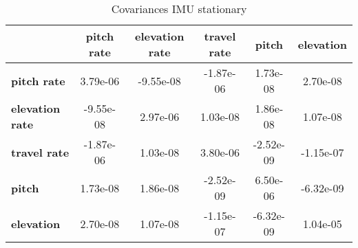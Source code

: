 \begin{table}[h!]
\centering
\begin{tiny}\begin{tabular}{|l|c|c|c|c|c|}
\hline
&\textbf{pitch rate}&\textbf{elevation rate}&\textbf{travel rate}&\textbf{pitch}&\textbf{elevation}\\\hline
\textbf{pitch rate}&3.79e-06&-9.55e-08&-1.87e-06&1.73e-08&2.70e-08\\\hline
\textbf{elevation rate}&-9.55e-08&2.97e-06&1.03e-08&1.86e-08&1.07e-08\\\hline
\textbf{travel rate}&-1.87e-06&1.03e-08&3.80e-06&-2.52e-09&-1.15e-07\\\hline
\textbf{pitch}&1.73e-08&1.86e-08&-2.52e-09&6.50e-06&-6.32e-09\\\hline
\textbf{elevation}&2.70e-08&1.07e-08&-1.15e-07&-6.32e-09&1.04e-05\\\hline
\end{tabular}
\end{tiny}
\caption{Covariances IMU stationary}
\label{table:V_I_stat}
\end{table}